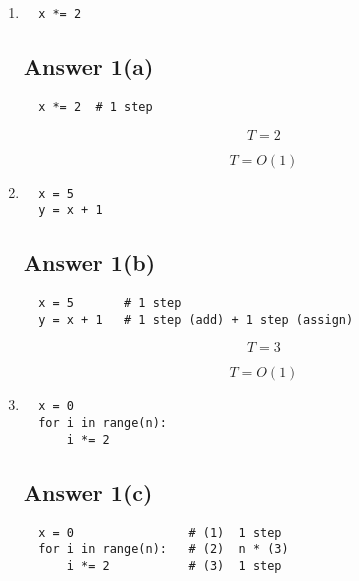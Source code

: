 \documentclass{article}
\begin{document}
\begin{enumerate}[label=(\alph*)]

\item 
\begin{verbatim}
  x *= 2
\end{verbatim}

\subsection*{Answer 1(a)}
\begin{verbatim}
  x *= 2  # 1 step
\end{verbatim}

\begin{equation*}
  T = 2
\end{equation*}

\begin{equation*}
  \boxed{T = O(1)}
\end{equation*}
      
\item
\begin{verbatim}
  x = 5
  y = x + 1
\end{verbatim}

\subsection*{Answer 1(b)}
\begin{verbatim}
  x = 5       # 1 step
  y = x + 1   # 1 step (add) + 1 step (assign)
\end{verbatim}

\begin{equation*}
  T = 3
\end{equation*}

\begin{equation*}
  \boxed{T = O(1)}
\end{equation*}

\item
\begin{verbatim}
  x = 0
  for i in range(n):
      i *= 2
\end{verbatim}

\subsection*{Answer 1(c)}
\begin{verbatim}
  x = 0                # (1)  1 step
  for i in range(n):   # (2)  n * (3)
      i *= 2           # (3)  1 step
\end{verbatim}


\end{enumerate}
\end{document}
